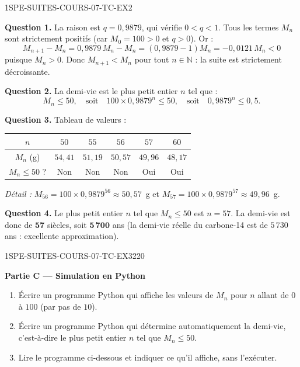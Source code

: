 \begin{corrige}{1SPE-SUITES-COURS-07-TC-EX2}

\textbf{Question 1.} La raison est $q = 0{,}9879$, qui vérifie $0 < q < 1$. Tous les termes $M_n$ sont strictement positifs (car $M_0 = 100 > 0$ et $q > 0$). Or :
\[
  M_{n+1} - M_n = 0{,}9879 \, M_n - M_n = (0{,}9879 - 1) M_n = -0{,}0121 \, M_n < 0
\]
puisque $M_n > 0$. Donc $M_{n+1} < M_n$ pour tout $n \in \mathbb{N}$ : la suite est strictement décroissante.


\textbf{Question 2.} La demi-vie est le plus petit entier $n$ tel que :
\[
  M_n \leq 50, \quad \text{soit} \quad 100 \times 0{,}9879^n \leq 50, \quad \text{soit} \quad 0{,}9879^n \leq 0{,}5.
\]

\textbf{Question 3.} Tableau de valeurs :

\begin{center}
\begin{tabular}{|c|c|c|c|c|c|}
\hline
$n$ & $50$ & $55$ & $56$ & $57$ & $60$ \\
\hline
$M_n$ (g) & $54{,}41$ & $51{,}19$ & $50{,}57$ & $49{,}96$ & $48{,}17$ \\
\hline
$M_n \leq 50$ ? & Non & Non & Non & Oui & Oui \\
\hline
\end{tabular}
\end{center}

\textit{Détail :} $M_{56} = 100 \times 0{,}9879^{56} \approx 50{,}57$~g et $M_{57} = 100 \times 0{,}9879^{57} \approx 49{,}96$~g.

\textbf{Question 4.} Le plus petit entier $n$ tel que $M_n \leq 50$ est $n = 57$. La demi-vie est donc de $\mathbf{57}$ siècles, soit $\mathbf{5\,700}$ ans (la demi-vie réelle du carbone-14 est de $5\,730$ ans : excellente approximation).

\end{corrige}

\bigskip


\begin{exercice}{1SPE-SUITES-COURS-07-TC-EX3}{2}{20}

\textbf{Partie C — Simulation en Python}

\begin{enumerate}
  \item Écrire un programme Python qui affiche les valeurs de $M_n$ pour $n$ allant de $0$ à $100$ (par pas de $10$).
  \item Écrire un programme Python qui détermine automatiquement la demi-vie, c'est-à-dire le plus petit entier $n$ tel que $M_n \leq 50$.
  \item Lire le programme ci-dessous et indiquer ce qu'il affiche, sans l'exécuter.
\end{enumerate}

\end{exercice}


